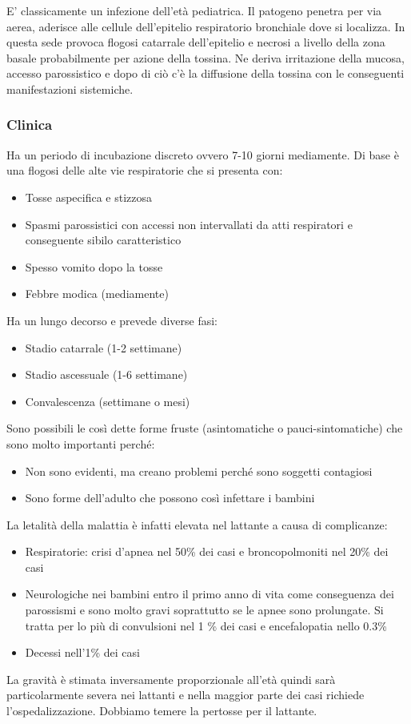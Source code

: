   E' classicamente un infezione dell'età pediatrica. Il patogeno penetra
  per via aerea, aderisce alle cellule dell'epitelio respiratorio
  bronchiale dove si localizza. In questa sede provoca flogosi catarrale
  dell'epitelio e necrosi a livello della zona basale probabilmente per
  azione della tossina. Ne deriva irritazione della mucosa, accesso
  parossistico e dopo di ciò c'è la diffusione della tossina con le
  conseguenti manifestazioni sistemiche.

\subsubsection{Clinica}
  Ha un periodo di incubazione discreto ovvero 7-10 giorni mediamente.
  Di base è una flogosi delle alte vie respiratorie che si presenta con:

\begin{itemize}
\item
  Tosse aspecifica e stizzosa
\item
  Spasmi parossistici con accessi non intervallati da atti respiratori e
  conseguente sibilo caratteristico
\item
  Spesso vomito dopo la tosse
\item
  Febbre modica (mediamente)
\end{itemize}
  Ha un lungo decorso e prevede diverse fasi:

\begin{itemize}
\item
  Stadio catarrale (1-2 settimane)
\item
  Stadio ascessuale (1-6 settimane)
\item
  Convalescenza (settimane o mesi)
\end{itemize}
  Sono possibili le così dette forme fruste (asintomatiche o
  pauci-sintomatiche) che sono molto importanti perché:

\begin{itemize}
\item
  Non sono evidenti, ma creano problemi perché sono soggetti contagiosi
\item
  Sono forme dell'adulto che possono così infettare i bambini
\end{itemize}
  La letalità della malattia è infatti elevata nel lattante a causa di
  complicanze:

\begin{itemize}
\item
  Respiratorie: crisi d'apnea nel 50\% dei casi e broncopolmoniti nel
  20\% dei casi
\item
  Neurologiche nei bambini entro il primo anno di vita come conseguenza
  dei parossismi e sono molto gravi soprattutto se le apnee sono
  prolungate. Si tratta per lo più di convulsioni nel 1 \% dei casi e
  encefalopatia nello 0.3\%
\item
  Decessi nell'1\% dei casi
\end{itemize}
  La gravità è stimata inversamente proporzionale all'età quindi sarà
  particolarmente severa nei lattanti e nella maggior parte dei casi
  richiede l'ospedalizzazione. Dobbiamo temere la pertosse per il
  lattante.

